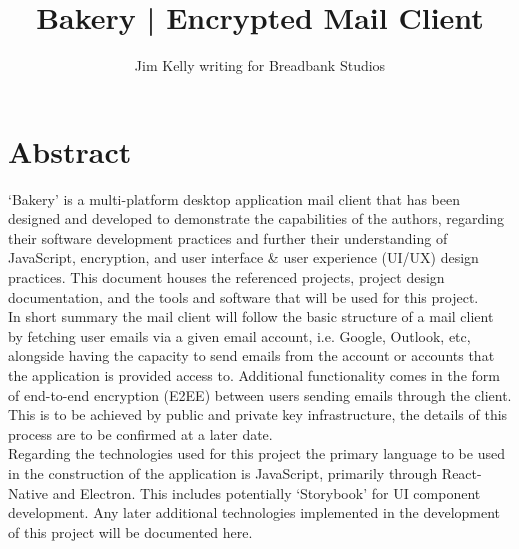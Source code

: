 \documentclass[12pt]{article}
\title{Bakery | Encrypted Mail Client}
\author{Jim Kelly writing for Breadbank Studios}
\begin{document}
\maketitle
\vspace{40pt}
\section*{Abstract}
	\noindent `Bakery' is a multi-platform desktop application mail client that has been designed and developed to demonstrate the capabilities of the authors, regarding their software development practices and further their understanding of JavaScript, encryption, and user interface \& user experience (UI/UX) design practices. This document houses the referenced projects, project design documentation, and the tools and software that will be used for this project.\\
	\newline
	\noindent In short summary the mail client will follow the basic structure of a mail client by fetching user emails via a given email account, i.e. Google, Outlook, etc, alongside having the capacity to send emails from the account or accounts that the application is provided access to. Additional functionality comes in the form of end-to-end encryption (E2EE) between users sending emails through the client. This is to be achieved by public and private key infrastructure, the details of this process are to be confirmed at a later date.\\
	\newline
	\noindent Regarding the technologies used for this project the primary language to be used in the construction of the application is JavaScript, primarily through React-Native and Electron. This includes potentially `Storybook'\cite{storybooks} for UI component development. Any later additional technologies implemented in the development of this project will be documented here.
\pagebreak
\tableofcontents
\pagebreak
\end{document}
